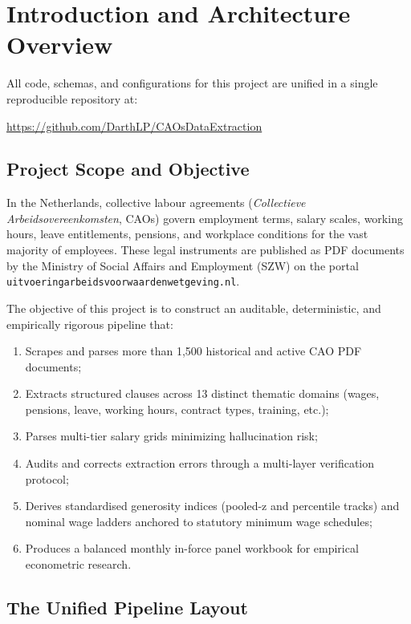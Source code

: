 \section{Introduction and Architecture Overview}
\label{sec:intro}

All code, schemas, and configurations for this project are unified in a single reproducible repository at:
\begin{center}
  \url{https://github.com/DarthLP/CAOsDataExtraction}
\end{center}

\subsection{Project Scope and Objective}

In the Netherlands, collective labour agreements (\emph{Collectieve Arbeidsovereenkomsten}, CAOs) govern employment terms, salary scales, working hours, leave entitlements, pensions, and workplace conditions for the vast majority of employees. These legal instruments are published as PDF documents by the Ministry of Social Affairs and Employment (SZW) on the portal \texttt{uitvoeringarbeidsvoorwaardenwetgeving.nl}. 

The objective of this project is to construct an auditable, deterministic, and empirically rigorous pipeline that:
\begin{enumerate}[leftmargin=1.8em]
  \item Scrapes and parses more than 1,500 historical and active CAO PDF documents;
  \item Extracts structured clauses across 13 distinct thematic domains (wages, pensions, leave, working hours, contract types, training, etc.);
  \item Parses multi-tier salary grids minimizing hallucination risk;
  \item Audits and corrects extraction errors through a multi-layer verification protocol;
  \item Derives standardised generosity indices (pooled-z and percentile tracks) and nominal wage ladders anchored to statutory minimum wage schedules;
  \item Produces a balanced monthly in-force panel workbook for empirical econometric research.
\end{enumerate}

\subsection{The Unified Pipeline Layout}

